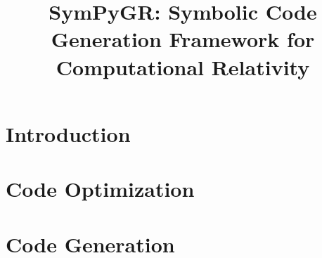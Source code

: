 \documentclass[a4paper,10pt]{article}
\title{SymPyGR: Symbolic Code Generation Framework for Computational Relativity }
\begin{document}
\maketitle

\section{Introduction}


\section{Code Optimization}


\section{Code Generation}


%
\end{document}
